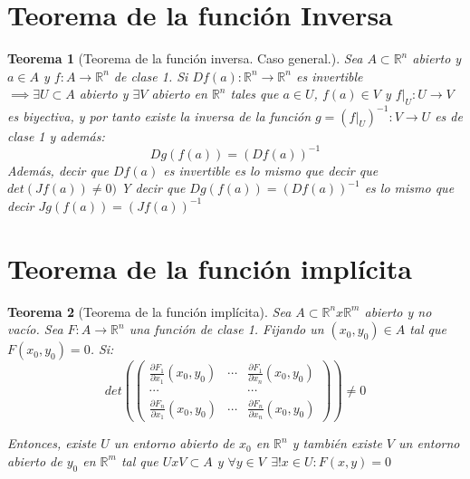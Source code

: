 \documentclass[11pt, a4paper]{article}
\newcommand{\R}{\mathbb{R}}
\theoremstyle{theorem-style}
\newtheorem*{nth}{Teorema}
\theoremstyle{definition-style}
\theoremstyle{remark-style}
\theoremstyle{example-style}
\begin{document}
\section{Teorema de la función Inversa}
\begin{nth}[Teorema de la función inversa. Caso general.]
	Sea $A \subset \R^n$ abierto y $a\in A$ y $f:A \to \R^n$ de clase 1. Si  
$Df(a): \R^n \to \R^n$ es invertible \\
$\implies \exists U\subset A$ abierto y $\exists V$ abierto en $\R^n$ tales que $a\in U $, $f(a) \in V$ y $f|_U : U \to V$ es biyectiva, y por tanto existe la inversa de la función $g = (f|_U)^{-1}: V \to U$ es de clase 1 y además:
	\[
	Dg(f(a)) = (Df(a))^{-1}
	\]
Además, decir que $Df(a)$ es invertible es lo mismo que decir que $det(Jf(a)) \ne 0)$
Y decir que $Dg(f(a)) = (Df(a))^{-1}$ es lo mismo que decir $Jg(f(a)) = (Jf(a))^{-1}$
\end{nth}

\section{Teorema de la función implícita}
\begin{nth}[Teorema de la función implícita]
	Sea $A \subset \R^n x\R^m$ abierto y no vacío. Sea $F: A \to \R^n$ una función de clase 1. Fijando un $(x_0,y_0) \in A$ tal que $F(x_0,y_0) = 0$. Si:
	\[
	det(\begin{pmatrix}
 \frac{\partial F_1}{\partial x_1}(x_0,y_0) & \cdots & \frac{\partial F_1}{\partial x_n}(x_0,y_0) \\
 \cdots& & \cdots\\
 
 \frac{\partial F_n}{\partial x_1}(x_0,y_0) & \cdots & \frac{\partial F_n}{\partial x_n} (x_0,y_0)
\end{pmatrix}) \ne 0
	\]
	
	Entonces, existe $U$ un entorno abierto de $x_0$ en $\R^n$ y también existe $V$ un entorno abierto de $y_0$ en $\R^m$ tal que $UxV \subset A$ y $\forall y \in V \ \ \exists! x \in U : F(x,y) = 0$
\end{nth}
\end{document}
